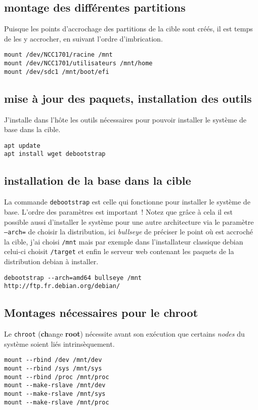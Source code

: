 \documentclass[12pt, a4paper]{article}
\begin{document}
\subsection{montage des différentes partitions}
Puisque les points d'accrochage des partitions de la cible sont créés, il est temps de les y accrocher, en suivant l'ordre d'imbrication.
\begin{verbatim}
mount /dev/NCC1701/racine /mnt
mount /dev/NCC1701/utilisateurs /mnt/home
mount /dev/sdc1 /mnt/boot/efi
\end{verbatim}

\subsection{mise à jour des paquets, installation des outils}
J'installe dans l'hôte les outils nécessaires pour pouvoir installer le système de base dans la cible.
\begin{verbatim}
apt update
apt install wget debootstrap
\end{verbatim}

\subsection{installation de la base dans la cible}
La commande \texttt{debootstrap} est celle qui fonctionne pour installer le système de base. 
L'ordre des paramètres est important~!
Notez que grâce à cela il est possible aussi d'installer le système pour une autre architecture via le paramètre \texttt{--arch=} de choisir la distribution, ici \emph{bullseye\/} de préciser le point où est accroché la cible, j'ai choisi \texttt{/mnt} mais par exemple dans l'installateur classique debian celui-ci choisit \texttt{/target} et enfin le serveur web contenant les paquets de la distribution debian à installer.
\begin{verbatim}
debootstrap --arch=amd64 bullseye /mnt http://ftp.fr.debian.org/debian/
\end{verbatim}

\subsection{Montages nécessaires pour le chroot}
Le \texttt{chroot} (\textbf{ch}ange \textbf{root}) nécessite avant son exécution que certains \emph{nodes\/} du système soient liés intrinsèquement.
\begin{verbatim}
mount --rbind /dev /mnt/dev
mount --rbind /sys /mnt/sys
mount --rbind /proc /mnt/proc
mount --make-rslave /mnt/dev
mount --make-rslave /mnt/sys
mount --make-rslave /mnt/proc
\end{verbatim}
\end{document}
